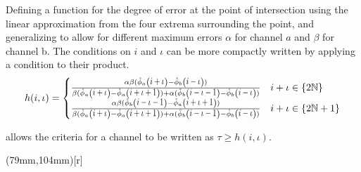 Defining a function for the degree of error at the point of intersection using the linear approximation from the four extrema surrounding the point, and generalizing to allow for different maximum errors $\alpha$ for channel $a$ and $\beta$ for channel b. The conditions on $i$ and $\iota$ can be more compactly written by applying a condition to their product.
\begin{equation}\label{eq:generalisedPerturbation}
h(i,\iota)  = \begin{cases}
\frac{\alpha  \beta  (\extremaTheta{a} {i+\iota }-\extremaTheta{b} {i-\iota })}
{\beta  (\extremaTheta{a} {i+\iota } - \extremaTheta{a} {i+\iota +1} ) + \alpha  (\extremaTheta{b} {i-\iota -1} - \extremaTheta{b} {i-\iota } ) }  &
  i + \iota \in \{2 \mathbb{N}     \}  \\
\frac{\alpha  \beta  (\extremaTheta{b} {i-\iota -1}-\extremaTheta{a} {i+\iota +1})}
{\beta  ( \extremaTheta{a} { i+\iota } -\extremaTheta{a} { i+\iota + 1 } ) +\alpha  ( \extremaTheta{b} {i-\iota -1} -\extremaTheta{b} {i-\iota } ) }  & 
i + \iota \in \{2 \mathbb{N}  + 1 \} 
\end{cases}
\end{equation}

allows the criteria for a channel to be written as $\tau \ge h(i,\iota)$. 

\parpic(79mm,104mm)[r]{
}


